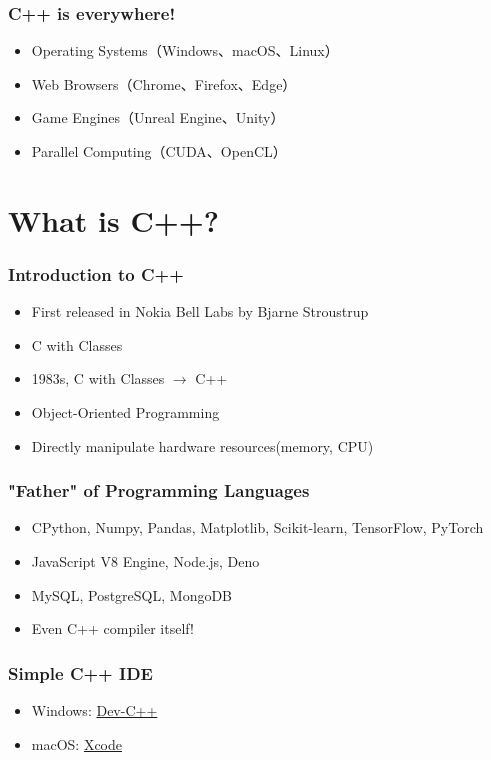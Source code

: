 \documentclass[xcolor=dvipsnames]{beamer}
\begin{document}
    \begin{frame}
        \frametitle{C++ is everywhere!}
        \begin{itemize}
            \item Operating Systems（Windows、macOS、Linux）
            \item Web Browsers（Chrome、Firefox、Edge）
            \item Game Engines（Unreal Engine、Unity）
            \item Parallel Computing（CUDA、OpenCL）
        \end{itemize}
    \end{frame}

    \section{What is C++?}
    
    \begin{frame}
        \frametitle{Introduction to C++}
        \begin{itemize}
            \item First released in Nokia Bell Labs by Bjarne Stroustrup
            \item C with Classes
            \item 1983s, C with Classes $\rightarrow$ C++
            \item Object-Oriented Programming
            \item Directly manipulate hardware resources(memory, CPU)
        \end{itemize}
    \end{frame}

    \begin{frame}
        \frametitle{"Father" of Programming Languages}
        \begin{itemize}
            \item CPython, Numpy, Pandas, Matplotlib, Scikit-learn, TensorFlow, PyTorch
            \item JavaScript V8 Engine, Node.js, Deno
            \item MySQL, PostgreSQL, MongoDB
            \item Even C++ compiler itself!
        \end{itemize}
    \end{frame}

    \begin{frame}
        \frametitle{Simple C++ IDE}
        \begin{itemize}
            \item Windows: \href{https://sourceforge.net/projects/orwelldevcpp/}{Dev-C++}
            \item macOS: \href{https://developer.apple.com/xcode/}{Xcode}
        \end{itemize}
    \end{frame}
\end{document}
